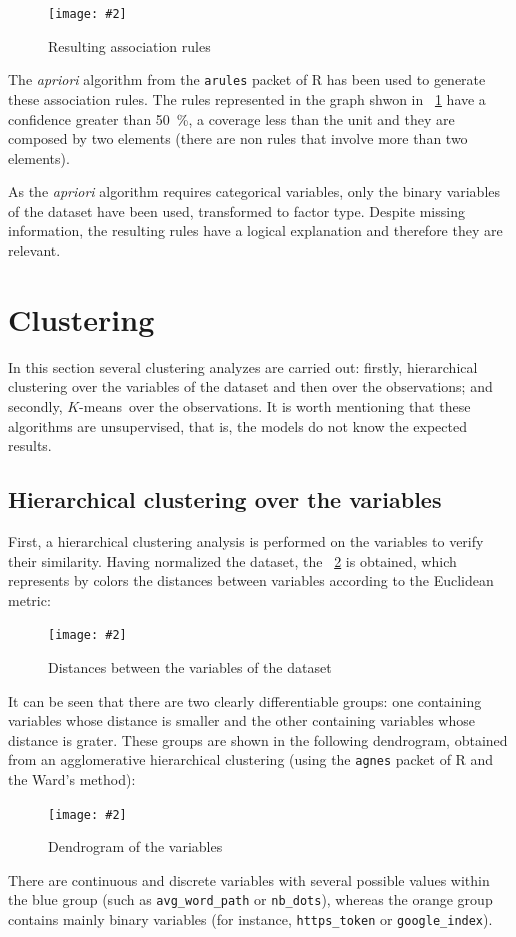 \documentclass[12pt, a4paper]{article}
\renewcommand{\textit}{\textsl}
\newcommand*{\figref}[1]{\figurename~\ref{fig:#1}}
\newcommand{\figcaption}[4][H]{
  \begin{figure}[#1]
    \centering
    \texttt{[image: \#2]}
    \caption{#3}
    \label{fig:#2}
  \end{figure}
}
\newcommand*{\kmeans}{$K$-means}
\begin{document}
    \figcaption{rules.png}{Resulting association rules}{1}

    The \textit{apriori} algorithm from the \texttt{arules} packet of R has been used to generate these association rules. The rules represented in the graph shwon in \figref{rules.png} have a confidence greater than \SI{50}{\percent}, a coverage less than the unit and they are composed by two elements (there are non rules that involve more than two elements).

    As the \textit{apriori} algorithm requires categorical variables, only the binary variables of the dataset have been used, transformed to factor type. Despite missing information, the resulting rules have a logical explanation and therefore they are relevant.

  \section{Clustering}

    In this section several clustering analyzes are carried out: firstly, hierarchical clustering over the variables of the dataset and then over the observations; and secondly, \kmeans\ over the observations. It is worth mentioning that these algorithms are unsupervised, that is, the models do not know the expected results.

    \subsection{Hierarchical clustering over the variables}

      First, a hierarchical clustering analysis is performed on the variables to verify their similarity. Having normalized the dataset, the \figref{dist_var.png} is obtained, which represents by colors the distances between variables according to the Euclidean metric:

      \figcaption{dist_var.png}{Distances between the variables of the dataset}{1}

      It can be seen that there are two clearly differentiable groups: one containing variables whose distance is smaller and the other containing variables whose distance is grater. These groups are shown in the following dendrogram, obtained from an agglomerative hierarchical clustering (using the \texttt{agnes} packet of R and the Ward's method):

      \figcaption{dend_var.png}{Dendrogram of the variables}{1}

      There are continuous and discrete variables with several possible values within the blue group (such as \texttt{avg\_word\_path} or \texttt{nb\_dots}), whereas the orange group contains mainly binary variables (for instance, \texttt{https\_token} or \texttt{google\_index}).
\end{document}
